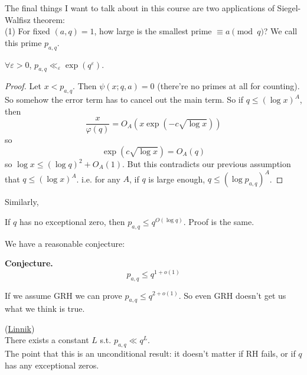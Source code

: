 \documentclass[a4paper]{article}
\begin{document}
The final things I want to talk about in this course are two applications of Siegel-Walfisz theorem:\\
(1) For fixed $(a,q) = 1$, how large is the smallest prime $\equiv a \pmod q$? We call this prime $p_{a,q}$.
\begin{coro}
$\forall \varepsilon>0$, $p_{a,q} \ll_\varepsilon \exp(q^\varepsilon)$.
\begin{proof}
Let $x < p_{a,q}$. Then $\psi(x;q,a) = 0$ (there're no primes at all for counting). So somehow the error term has to cancel out the main term. So if $q \leq (\log x)^A$, then
\[
\frac{x}{\varphi(q)} = O_A(x \exp(-c\sqrt{\log x}))
\]
so
\[
\exp(c\sqrt{\log x}) = O_A(q)
\]
so $\log x \leq (\log q)^2 + O_A(1)$. But this contradicts our previous assumption that $q \leq (\log x)^A$. i.e. for any $A$, if $q$ is large enough, $q \leq (\log p_{a,q})^A$.
\end{proof}
\end{coro}
Similarly,
\begin{coro}
If $q$ has no exceptional zero, then $p_{a,q} \leq q^{O(\log q)}$. Proof is the same.
\end{coro}
We have a reasonable conjecture:

\textbf{Conjecture.}
\[
p_{a,q} \leq q^{1+o(1)}
\]

If we assume GRH we can prove $p_{a,q} \leq q^{2+o(1)}$. So even GRH doesn't get us what we think is true.

\begin{thm} (\href{https://en.m.wikipedia.org/wiki/Linnik%27s_theorem}{Linnik})\\
There exists a constant $L$ s.t. $p_{a,q} \ll q^L$.\\
The point that this is an unconditional result: it doesn't matter if RH fails, or if $q$ has any exceptional zeros.
\end{thm}
\end{document}
